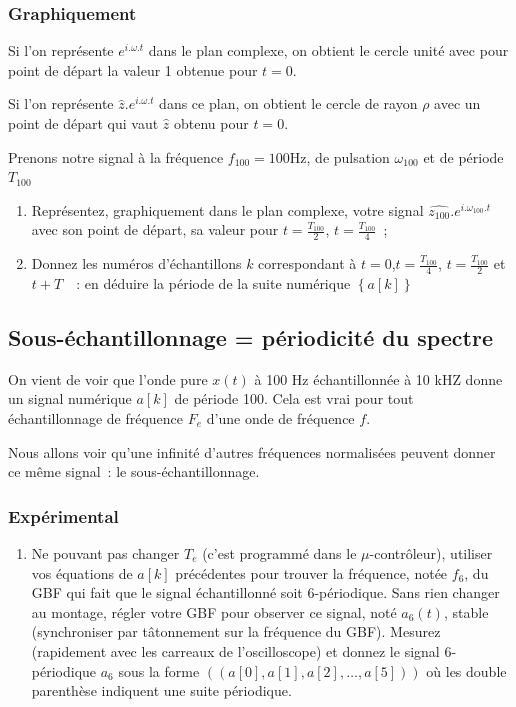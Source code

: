 \documentclass[a4paper,twoside,12pt]{report}           %
\begin{document}
\subsubsection{Graphiquement}

Si l'on représente $e^{i.\omega.t}$ dans le plan complexe, on obtient
le cercle unité avec pour point de départ la valeur 1 obtenue pour
$t=0$.

Si l'on représente $\hat{z}.e^{i.\omega.t}$ dans ce plan, on obtient
le cercle de rayon $\rho$ avec un point de départ qui vaut $\hat{z}$
obtenu pour $t=0$.

Prenons notre signal à la fréquence $f_{100}=100$Hz, de pulsation
$\omega_{100}$ et de période $T_{100}$

\begin{enumerate}
\item Représentez, graphiquement dans le plan complexe, votre signal
  $\hat{z_{100}}.e^{i.\omega_{100}.t}$ avec son point de départ, sa
  valeur pour $t=\frac{T_{100}}{2}$, $t=\frac{T_{100}}{4}$~;
\item Donnez les numéros d'échantillons $k$ correspondant à
  $t=0$,$t=\frac{T_{100}}{4}$, $t=\frac{T_{100}}{2}$ et $t+T$~~: en
  déduire la période de la suite numérique $\left\{a[k]\right\}$
\end{enumerate}

\subsection{Sous-échantillonnage = périodicité du spectre}

On vient de voir que l'onde pure $x(t)$ à 100 Hz échantillonnée à 10
kHZ donne un signal numérique $a[k]$ de période 100.  Cela est vrai
pour tout échantillonnage de fréquence $F_e$ d'une onde de fréquence
$f$.

Nous allons voir qu'une infinité d'autres fréquences normalisées
peuvent donner ce même signal~: le sous-échantillonnage.

\subsubsection{Expérimental}
\begin{enumerate}
\item Ne pouvant pas changer $T_e$ (c'est programmé dans le
  $\mu$-contrôleur), utiliser vos équations de $a[k]$ précédentes pour
  trouver la fréquence, notée $f_6$, du GBF qui fait que le signal
  échantillonné soit 6-périodique.  Sans rien changer au montage,
  régler votre GBF pour observer ce signal, noté $a_6(t)$, stable
  (synchroniser par tâtonnement sur la fréquence du GBF). Mesurez
  (rapidement avec les carreaux de l'oscilloscope) et donnez le signal
  6-périodique $a_6$ sous la forme
  $(\!( a[0], a[1], a[2], \dots, a[5])\!)$ où les double parenthèse
  indiquent une suite périodique.
\end{enumerate}
\end{document}
